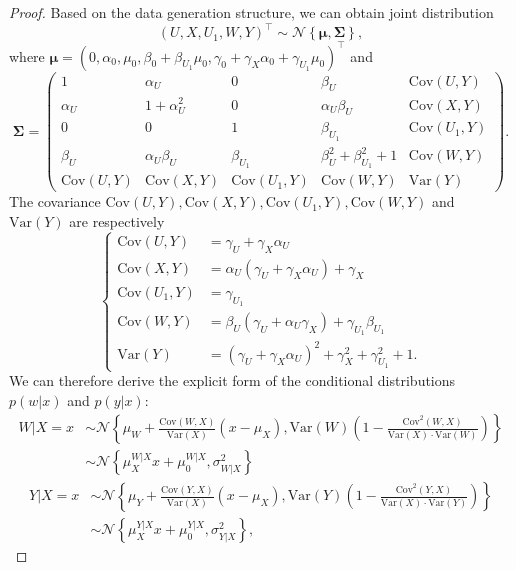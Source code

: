 \documentclass[
  12pt]{article}
\def\cN{\mathcal{N}}
\begin{document}
\begin{proof}
Based on the data generation structure, we can obtain joint distribution
$$
\left( U,X,U_1,W,Y \right)^\top \sim \cN\left\{ \bm{\mu}, \bm{\Sigma} \right\}, 
$$
where $\bm{\mu}=(0,\alpha_0,\mu_0,\beta_0+\beta_{U_1}\mu_0,\gamma_0+\gamma_X\alpha_0+\gamma_{U_1}\mu_0)^{\top}$ and 
$$
\bm{\Sigma}=\begin{pmatrix}
	1&		\alpha_U&		0&		\beta_U&		\mathrm{Cov}(U,Y)\\
	\alpha_U&		1+\alpha_{U}^{2}&		0&		\alpha_U\beta_U&		\mathrm{Cov}(X,Y)\\
	0&		0&		1&		\beta_{U_1}&		\mathrm{Cov}(U_1,Y)\\
	\beta_U&		\alpha_U\beta_U&		 \beta_{U_1}&		\beta_U^2+\beta_{U_1}^{2}+1&		\mathrm{Cov}(W,Y)\\
	\mathrm{Cov}(U,Y)&		\mathrm{Cov}(X,Y)&		\mathrm{Cov}(U_1,Y)&		\mathrm{Cov}(W,Y)&		\mathrm{Var}(Y)
\end{pmatrix}. 
$$
The covariance $\mathrm{Cov}(U,Y),\mathrm{Cov}(X,Y),\mathrm{Cov}(U_1,Y),\mathrm{Cov}(W,Y)$ and $\mathrm{Var}(Y)$ are respectively
$$
\left\{ \begin{aligned}
	\mathrm{Cov}(U,Y)&=\gamma_U+\gamma_X\alpha_U\\
	\mathrm{Cov}(X,Y)&=\alpha_U\left( \gamma_U+\gamma_X\alpha_U \right) +\gamma_X\\
	\mathrm{Cov}(U_1,Y)&=\gamma_{U_1}\\
	\mathrm{Cov}(W,Y)&=\beta_U \left( \gamma_U+\alpha_U\gamma_X\right) +\gamma_{U_1}\beta_{U_1}\\
	\mathrm{Var}(Y)&=(\gamma_U+\gamma_X\alpha_U)^2+\gamma_{X}^{2}+\gamma_{U_1}^2+1.
\end{aligned} \right. 
$$
We can therefore derive the explicit form of the conditional distributions $p(w|x)$ and $p(y|x)$:
$$
\begin{aligned}
	W|X=x&\sim \cN\left\{ \mu_W+\frac{\mathrm{Cov}(W,X)}{\mathrm{Var}(X)}(x-\mu_{X}),\mathrm{Var}(W)\left( 1-\frac{\mathrm{Cov}^2(W,X)}{\mathrm{Var}(X)\cdot \mathrm{Var}(W)} \right) \right\}\\
	&\sim \cN\left\{ \mu_{X}^{W|X}x+\mu_{0}^{W|X},\sigma_{W|X}^{2} \right\} 
\end{aligned}
$$
$$
\begin{aligned}
    Y|X=x&\sim \cN\left\{ \mu_Y+\frac{\mathrm{Cov}(Y,X)}{\mathrm{Var}(X)}(x-\mu_{X}),\mathrm{Var}(Y)\left( 1-\frac{\mathrm{Cov}^2(Y,X)}{\mathrm{Var}(X)\cdot \mathrm{Var}(Y)} \right) \right\}\nonumber \\
	&\sim \cN\left\{ \mu_{X}^{Y|X}x+\mu_{0}^{Y|X},\sigma_{Y|X}^{2} \right\},

\end{aligned}$$
\end{proof}
\end{document}
